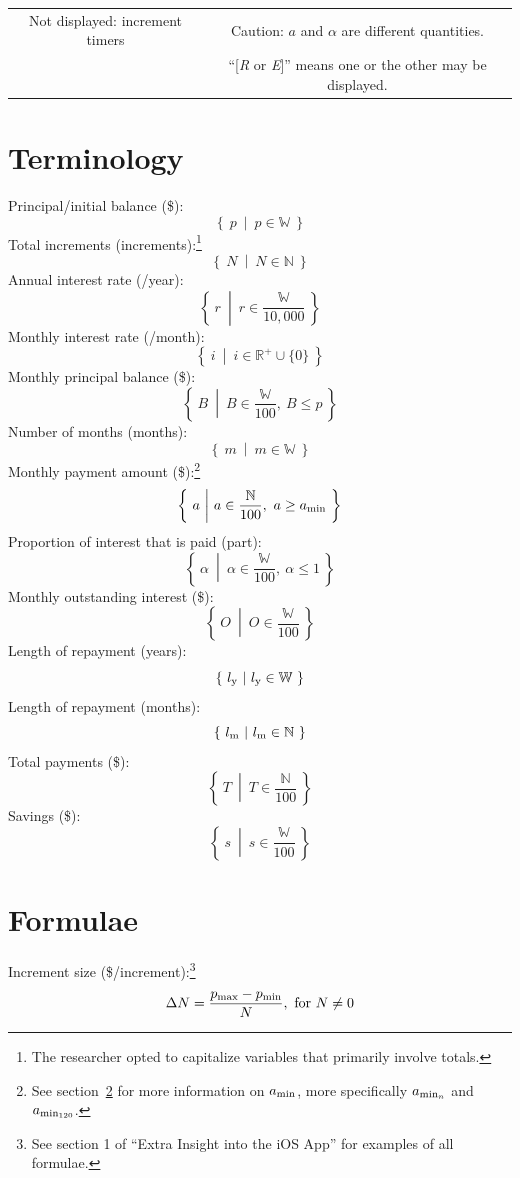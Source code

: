 \documentclass[12pt,letterpaper,oneside]{article}
\theoremstyle{remark} %
\begin{document}
\begin{table}[H]
{\begin{minipage}{1.25\textwidth}
\begin{tabular}{c c}
					Not displayed: increment timers & Caution: $a$ and $\alpha$ are different quantities. \\
					& ``[\textit{R} or \textit{E}]'' means one or the other may be displayed. \\
				\end{tabular}
			\end{minipage}
		}
	\end{table}

	\newpage

\section{Terminology}

	Principal/initial balance (\$):
	$$\left\{\ p\ \middle|\ p\in\mathbb{W}\ \right\}$$
	Total increments (increments):\footnote{The researcher opted to capitalize variables that primarily involve totals.}
	$$\left\{\ N\ \middle|\ N\in\mathbb{N}\ \right\}$$
	Annual interest rate (/year):
	$$\left\{\ r\ \middle|\ r\in\frac{\mathbb{W}}{10,000}\ \right\}$$
	Monthly interest rate (/month):
	$$\left\{\ i\ \middle|\ i\in\mathbb{R}^{+}\cup\{0\}\ \right\}$$
	Monthly principal balance (\$):
	$$\left\{\ B\ \middle|\ B\in\frac{\mathbb{W}}{100},\ B\leq p\ \right\}$$
	Number of months (months):
	$$\left\{\ m\ \middle|\ m\in\mathbb{W}\ \right\}$$
	Monthly payment amount (\$):\footnote{See section~\ref{section2} for more information on $a_{\rm{min}}$, more specifically $a_{\rm{min_{\mathnormal{n}}}}$ and $a_{\rm{min_{120}}}$.}
	$$\left\{\ a\ \middle|\ a\in\frac{\mathbb{N}}{100},\ a\geq a_{\rm{min}}\ \right\}$$
	Proportion of interest that is paid (part):
	$$\left\{\ \alpha\ \middle|\ \alpha\in\frac{\mathbb{W}}{100},\ \alpha\leq 1\ \right\}$$
	Monthly outstanding interest (\$):
	$$\left\{\ O\ \middle|\ O\in\frac{\mathbb{W}}{100}\ \right\}$$
	Length of repayment (years):
	$$\left\{\ l_{\rm{y}}\ \middle|\ l_{\rm{y}}\in\mathbb{W}\ \right\}$$
	Length of repayment (months):
	$$\left\{\ l_{\rm{m}}\ \middle|\ l_{\rm{m}}\in\mathbb{N}\ \right\}$$
	Total payments (\$):
	$$\left\{\ T\ \middle|\ T\in\frac{\mathbb{N}}{100}\ \right\}$$
	Savings (\$):
	$$\left\{\ s\ \middle|\ s\in\frac{\mathbb{W}}{100}\ \right\}$$

	\newpage

\section{Formulae}\label{section2}

	Increment size (\$/increment):\footnote{See section 1 of ``Extra Insight into the iOS App'' for examples of all formulae.}
	$$\Delta N=\frac{p_{\rm{max}}-p_{\rm{min}}}{N},\mbox{ for }N\neq 0$$
\end{document}
